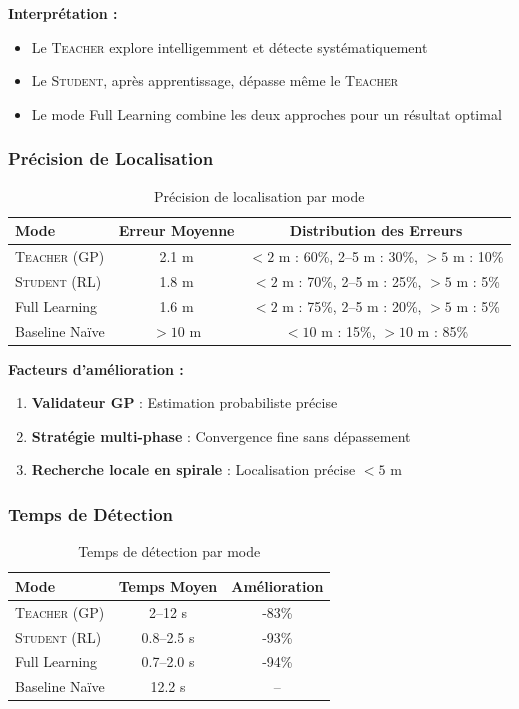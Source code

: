\documentclass[12pt,a4paper]{article}
\newcommand{\teacher}{\textsc{Teacher}}
\newcommand{\student}{\textsc{Student}}
\newcommand{\gp}{\textsc{GP}}
\newcommand{\rl}{\textsc{RL}}
\begin{document}
\textbf{Interprétation :}
\begin{itemize}
    \item Le \teacher{} explore intelligemment et détecte systématiquement
    \item Le \student{}, après apprentissage, dépasse même le \teacher{}
    \item Le mode Full Learning combine les deux approches pour un résultat optimal
\end{itemize}

\subsubsection{Précision de Localisation}

\begin{table}[H]
\centering
\begin{tabular}{lcc}
\toprule
\textbf{Mode} & \textbf{Erreur Moyenne} & \textbf{Distribution des Erreurs} \\
\midrule
\teacher{} (\gp{}) & 2.1 m & $< 2$ m : 60\%, 2--5 m : 30\%, $> 5$ m : 10\% \\
\student{} (\rl{}) & 1.8 m & $< 2$ m : 70\%, 2--5 m : 25\%, $> 5$ m : 5\% \\
Full Learning & 1.6 m & $< 2$ m : 75\%, 2--5 m : 20\%, $> 5$ m : 5\% \\
Baseline Naïve & $> 10$ m & $< 10$ m : 15\%, $> 10$ m : 85\% \\
\bottomrule
\end{tabular}
\caption{Précision de localisation par mode}
\end{table}

\textbf{Facteurs d'amélioration :}
\begin{enumerate}
    \item \textbf{Validateur \gp{}} : Estimation probabiliste précise
    \item \textbf{Stratégie multi-phase} : Convergence fine sans dépassement
    \item \textbf{Recherche locale en spirale} : Localisation précise $< 5$ m
\end{enumerate}

\subsubsection{Temps de Détection}

\begin{table}[H]
\centering
\begin{tabular}{lcc}
\toprule
\textbf{Mode} & \textbf{Temps Moyen} & \textbf{Amélioration} \\
\midrule
\teacher{} (\gp{}) & 2--12 s & -83\% \\
\student{} (\rl{}) & 0.8--2.5 s & -93\% \\
Full Learning & 0.7--2.0 s & -94\% \\
Baseline Naïve & 12.2 s & -- \\
\bottomrule
\end{tabular}
\caption{Temps de détection par mode}
\end{table}
\end{document}
